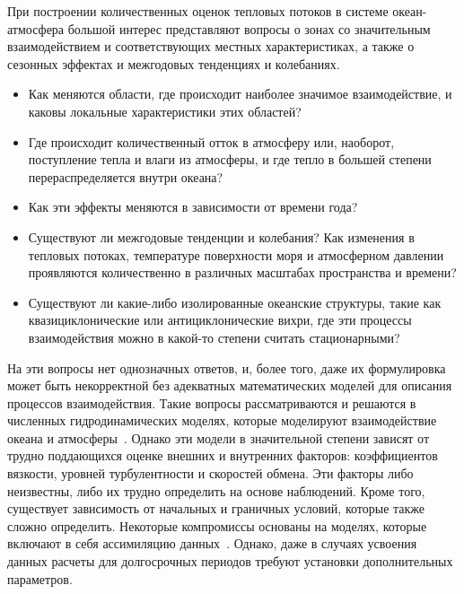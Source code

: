 При построении количественных оценок тепловых потоков в системе океан-атмосфера большой интерес представляют вопросы о зонах со значительным взаимодействием и соответствующих местных характеристиках, а также о сезонных эффектах и межгодовых тенденциях и колебаниях.
\begin{itemize}
	\item Как меняются области, где происходит наиболее значимое взаимодействие, и каковы локальные характеристики этих областей?
	\item Где происходит количественный отток в атмосферу или, наоборот, поступление тепла и влаги из атмосферы, и где тепло в большей степени перераспределяется внутри океана?
	\item Как эти эффекты меняются в зависимости от времени года?
	\item Существуют ли межгодовые тенденции и колебания? Как изменения в тепловых потоках, температуре поверхности моря и атмосферном давлении проявляются количественно в различных масштабах пространства и времени?
	\item Существуют ли какие-либо изолированные океанские структуры, такие как квазициклонические или антициклонические вихри, где эти процессы взаимодействия можно в какой-то степени считать стационарными?
\end{itemize}
На эти вопросы нет однозначных ответов, и, более того, даже их формулировка может быть некорректной без адекватных математических моделей для описания процессов взаимодействия.
Такие вопросы рассматриваются и решаются в численных гидродинамических моделях, которые моделируют взаимодействие океана и атмосферы~\cite{gulev2012probability}.
Однако эти модели в значительной степени зависят от трудно поддающихся оценке внешних и внутренних факторов: коэффициентов вязкости, уровней турбулентности и скоростей обмена. Эти факторы либо неизвестны, либо их трудно определить на основе наблюдений. Кроме того, существует зависимость от начальных и граничных условий, которые также сложно определить. Некоторые компромиссы основаны на моделях, которые включают в себя ассимиляцию данных~\cite{FAO}. Однако, даже в случаях усвоения данных расчеты для долгосрочных периодов требуют установки дополнительных параметров.

